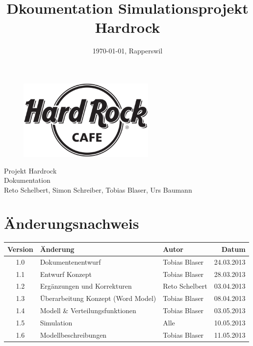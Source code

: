 \documentclass[ngerman,a4paper,12pt]{scrreprt}
\title{Dkoumentation Simulationsprojekt Hardrock}
\date{\today{}, Rapperswil}
\def\author{Reto Schelbert, Simon Schreiber, Tobias Blaser, Urs Baumann}
\begin{document}
\thispagestyle{empty}
\begin{titlepage}
	\begin{center}

	\vspace*{40mm}
	
	\begin{figure}[htp]
		\centering
		\includegraphics[width=0.60\textwidth]{img/Hard-Rock-Cafe-Logo-Black-White.png}
	\end{figure}		
	\vspace*{20mm}
	
	{\fontsize{40}{48} \selectfont Projekt Hardrock \\[10mm]}
	{\fontsize{32}{48} \selectfont Dokumentation \\[5mm]}	
	\vspace*{20mm}
	\author

\end{center}
\end{titlepage}
\clearpage

\chapter*{Änderungsnachweis}
\begin{tabularx}{\textwidth}{|cXlr|} %
		\hline
		\textbf{Version} & \textbf{Änderung} & \textbf{Autor} & \textbf{Datum}\\
		\hline
		1.0 & Dokumentenentwurf & Tobias Blaser & 24.03.2013 \\
		1.1 & Entwurf Konzept & Tobias Blaser & 28.03.2013 \\
		1.2 & Ergänzungen und Korrekturen & Reto Schelbert & 03.04.2013 \\
		1.3 & Überarbeitung Konzept (Word Model) & Tobias Blaser & 08.04.2013 \\
		1.4 & Modell \& Verteilungsfunktionen & Tobias Blaser & 03.05.2013 \\
		1.5 & Simulation & Alle & 10.05.2013 \\
		1.6 & Modellbeschreibungen & Tobias Blaser & 11.05.2013\\
		\hline
\end{tabularx}
\end{document}
